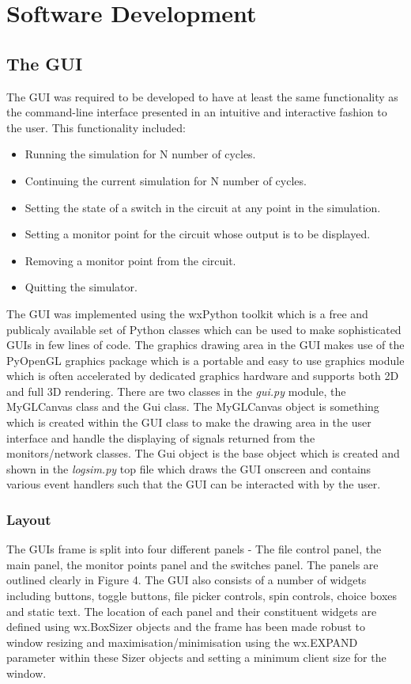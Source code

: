 \documentclass{article}					%
\begin{document}
\section{Software Development}
\subsection{The GUI}
The GUI was required to be developed to have at least the same functionality as the command-line interface presented in an intuitive and interactive fashion to the user. This functionality included:
\begin{itemize}
  \item Running the simulation for N number of cycles.
  \item Continuing the current simulation for N number of cycles.
  \item Setting the state of a switch in the circuit at any point in the simulation.
  \item Setting a monitor point for the circuit whose output is to be displayed.
  \item Removing a monitor point from the circuit.
  \item Quitting the simulator.
\end{itemize}
The GUI was implemented using the wxPython toolkit which is a free and publicaly available set of Python classes which can be used to make sophisticated GUIs in few lines of code. The graphics drawing area in the GUI makes use of the PyOpenGL graphics package which is a portable and easy to use graphics module which is often accelerated by dedicated graphics hardware and supports both 2D and full 3D rendering. There are two classes in the \textit{gui.py} module, the MyGLCanvas class and the Gui class. The MyGLCanvas object is something which is created within the GUI class to make the drawing area in the user interface and handle the displaying of signals returned from the monitors/network classes. The Gui object is the base object which is created and shown in the \textit{logsim.py} top file which draws the GUI onscreen and contains various event handlers such that the GUI can be interacted with by the user.

\subsubsection{Layout}
The GUIs frame is split into four different panels - The file control panel, the main panel, the monitor points panel and the switches panel. The panels are outlined clearly in Figure 4. The GUI also consists of a number of widgets including buttons, toggle buttons, file picker controls, spin controls, choice boxes and static text. The location of each panel and their constituent widgets are defined using wx.BoxSizer objects and the frame has been made robust to window resizing and maximisation/minimisation using the wx.EXPAND parameter within these Sizer objects and setting a minimum client size for the window.
\end{document}
